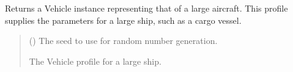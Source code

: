 \documentclass[letterpaper,10pt,english]{sphinxmanual}
\begin{document}
\begin{fulllineitems}
\label{\detokenize{modules/waypoints/vehicle:qnav.waypoints.vehicle.get_large_ship_profile}}
\pysigstartsignatures
{}
\pysigstopsignatures
\sphinxAtStartPar
Returns a Vehicle instance representing that of a large aircraft.
This profile supplies the parameters for a large ship, such as a cargo
vessel.
\begin{quote}\begin{description}
\sphinxAtStartPar
{} () \textendash{} The seed to use for random number generation.

\sphinxAtStartPar
The Vehicle profile for a large ship.

\sphinxAtStartPar
{\hyperref[\detokenize{modules/waypoints/vehicle:qnav.waypoints.vehicle.Vehicle}]{}}

\end{description}\end{quote}

\end{fulllineitems}

\end{document}

